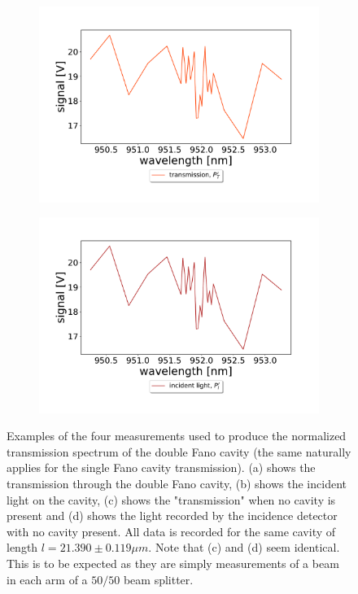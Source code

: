 \begin{figure}[h!]
\begin{subfigure}[b]{0.49\textwidth}
        \includegraphics[width=\textwidth]{figures/raw_data_transmission_no_cavity.pdf}
        \caption{}
        \label{fig:raw_data_trans_no_cavity}
    \end{subfigure}
    \begin{subfigure}[b]{0.49\textwidth}
        \includegraphics[width=\textwidth]{figures/raw_data_incident_light_no_cavity.pdf}
        \caption{}
        \label{fig:raw_data_incident_no_cavity}
    \end{subfigure}
    \caption{Examples of the four measurements used to produce the normalized transmission spectrum of the double Fano cavity (the same naturally applies for the single Fano cavity transmission). (a) shows the transmission through the double Fano cavity, (b) shows the incident light on the cavity, (c) shows the "transmission" when no cavity is present and (d) shows the light recorded by the incidence detector with no cavity present. All data is recorded for the same cavity of length $l=21.390 \pm 0.119 \mu m$. Note that (c) and (d) seem identical. This is to be expected as they are simply measurements of a beam in each arm of a $50/50$ beam splitter.}
    \label{fig:raw_data}
\end{figure}

